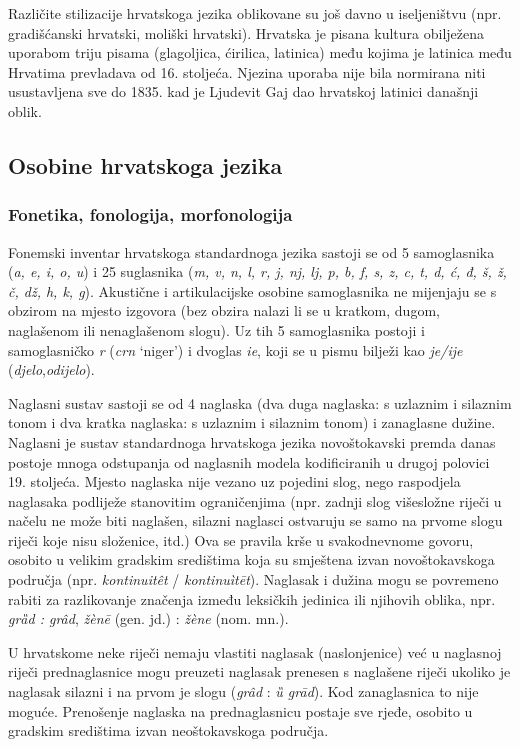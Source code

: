 \begin{multicols}{2}
Različite stilizacije hrvatskoga jezika oblikovane su još davno u iseljeništvu (npr. gradišćanski hrvatski, moliški hrvatski).
Hrvatska je pisana kultura obilježena uporabom triju pisama (glagoljica, ćirilica, latinica) među kojima je latinica među Hrvatima prevladava od 16. stoljeća. Njezina uporaba nije bila normirana niti usustavljena sve do 1835. kad je Ljudevit Gaj dao hrvatskoj latinici današnji oblik.

\subsection{Osobine hrvatskoga jezika}

\subsubsection{Fonetika, fonologija, morfonologija}

Fonemski inventar hrvatskoga standardnoga jezika sastoji se od 5 samoglasnika (\emph{a, e, i, o, u}) i 25 suglasnika (\emph{m, v, n, l, r, j, nj, lj, p, b, f, s, z, c, t, d, ć, đ, š, ž, č, dž, h, k, g}). Akustične i artikulacijske osobine samoglasnika ne mijenjaju se s obzirom na mjesto izgovora (bez obzira nalazi li se u kratkom, dugom, naglašenom ili nenaglašenom slogu). Uz tih 5 samoglasnika postoji i samoglasničko \emph{r} (\emph{crn} ‘niger’) i dvoglas \emph{ie}, koji se u pismu bilježi kao \emph{je/ije} (\emph{djelo},\emph{odijelo}).

Naglasni sustav sastoji se od 4 naglaska (dva duga naglaska: s uzlaznim i silaznim tonom i dva kratka naglaska: s uzlaznim i silaznim tonom) i zanaglasne dužine. Naglasni je sustav standardnoga hrvatskoga jezika novoštokavski premda danas postoje mnoga odstupanja od naglasnih modela kodificiranih u drugoj polovici 19. stoljeća. Mjesto naglaska nije vezano uz pojedini slog, nego raspodjela naglasaka podliježe stanovitim ograničenjima (npr. zadnji slog višesložne riječi u načelu ne može biti naglašen, silazni naglasci ostvaruju se samo na prvome slogu riječi koje nisu složenice, itd.) Ova se pravila krše u svakodnevnome govoru, osobito u velikim gradskim središtima koja su smještena izvan novoštokavskoga područja (npr. \emph{kontinuitêt} / \emph{kontinuìtēt}). Naglasak i dužina mogu se povremeno rabiti za razlikovanje značenja između leksičkih jedinica ili njihovih oblika, npr. \emph{grȁd : grâd}, \emph{žènē} (gen. jd.) : \emph{žène} (nom. mn.).

U hrvatskome neke riječi nemaju vlastiti naglasak (naslonjenice) već u naglasnoj riječi prednaglasnice mogu preuzeti naglasak prenesen s naglašene riječi ukoliko je naglasak silazni i na prvom je slogu (\emph{grâd} : \emph{ȕ grād}). Kod zanaglasnica to nije moguće. Prenošenje naglaska na prednaglasnicu postaje sve rjeđe, osobito u gradskim središtima izvan neoštokavskoga područja.


\end{multicols}
